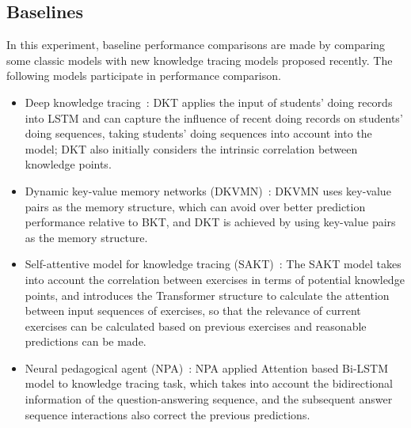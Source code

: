 \subsection{Baselines}
In this experiment, baseline performance comparisons are made by comparing some classic models with new knowledge tracing models proposed recently. The following models participate in performance comparison.
\begin{itemize}
    \item Deep knowledge tracing~\cite{piech2015deep}: DKT applies the input of students' doing records into LSTM and can capture the influence of recent doing records on students' doing sequences, taking students' doing sequences into account into the model; DKT also initially considers the intrinsic correlation between knowledge points.
    \item Dynamic key-value memory networks (DKVMN)~\cite{zhang2017dynamic}: DKVMN uses key-value pairs as the memory structure, which can avoid over better prediction performance relative to BKT, and DKT is achieved by using key-value pairs as the memory structure.
    \item Self-attentive model for knowledge tracing (SAKT)~\cite{sakt2019}: The SAKT model takes into account the correlation between exercises in terms of potential knowledge points, and introduces the Transformer structure to calculate the attention between input sequences of exercises, so that the relevance of current exercises can be calculated based on previous exercises and reasonable predictions can be made.
    \item Neural pedagogical agent (NPA)~\cite{Lee2019CreatingAN}: NPA applied Attention based Bi-LSTM model to knowledge tracing task, which takes into account the bidirectional information of the question-answering sequence, and the subsequent answer sequence interactions also correct the previous predictions.
\end{itemize}

